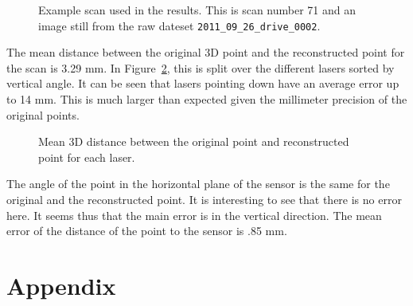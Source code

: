 \documentclass[english]{article}
\begin{document}
\begin{figure}
  \begin{center}
      \caption{Example scan used in the results. This is scan number 71 and an
      image still from the raw dateset \texttt{2011\_09\_26\_drive\_0002}.}
  \label{fig:example}
  \end{center}
\end{figure}

The mean distance between the original 3D point and the reconstructed point for
the scan is 3.29 mm. In Figure~\ref{fig:norms_error}, this is split over the
different lasers sorted by vertical angle. It can be seen that lasers pointing
down have an average error up to 14 mm. This is much larger than expected given
the millimeter precision of the original points. 

\begin{figure}
    \centering
    \def\svgwidth{\columnwidth}
    \scalebox{0.9}{
    \def\svgwidth{.6 \columnwidth}
      
    }
    \caption{Mean 3D distance between the original point and reconstructed point
    for each laser.}
		\label{fig:norms_error}
\end{figure}

The angle of the point in the horizontal plane of the sensor is the same for the
original and the reconstructed point. It is interesting to see that there is no
error here. It seems thus that the main error is in the vertical direction.  The
mean error of the distance of the point to the sensor is .85 mm.





\section*{Appendix}
\end{document}
